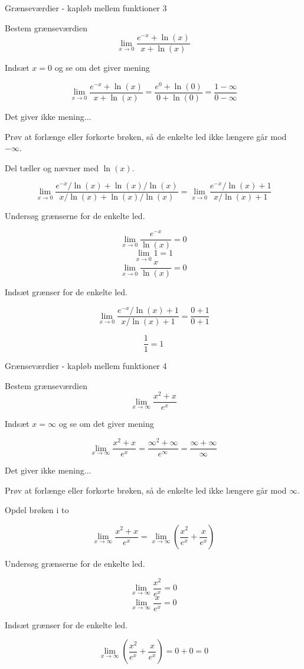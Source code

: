 \documentclass{article}
\begin{document}
\begin{exercise}{Grænseværdier - kapløb mellem funktioner 3}
	
	Bestem grænseværdien 
	\[
	\lim_{x \to 0} \frac{e^{-x}+ \ln(x)}{x+\ln(x)}
	\]
	
	
	\hint
	Indsæt $x=0$ og se om det giver mening
	
	\hint
	\[
	\lim_{x \to 0} \frac{e^{-x}+ \ln(x)}{x+\ln(x)} = \frac{e^{0}+ \ln(0)}{0+\ln(0)} = \frac{1 - \infty}{0 -\infty}
	\]
	
	\hint
	Det giver ikke mening...
	
	\hint
	Prøv at forlænge eller forkorte brøken, så de enkelte led ikke længere går mod $-\infty$. 
	
	\hint
	Del tæller og nævner med $\ln(x)$. 
	
	\hint
	\[
	\lim_{x \to 0} \frac{e^{-x}/\ln(x)+ \ln(x)/\ln(x)}{x/\ln(x)+\ln(x)/\ln(x)} = \lim_{x \to 0} \frac{e^{-x}/\ln(x)+ 1}{x/\ln(x)+1}
	\]
	
	\hint
	Undersøg grænserne for de enkelte led.
	
	\hint
	\[
	\lim_{x \to 0} \frac{e^{-x}}{\ln(x)} = 0
	\]
	\[
	\lim_{x \to 0} 1 = 1
	\]
	\[
	\lim_{x \to 0} \frac{x}{\ln(x)} = 0  
	\]
	
	\hint 
	Indsæt grænser for de enkelte led.
	
	\hint
	\[
	\lim_{x \to 0} \frac{e^{-x}/\ln(x)+ 1}{x/\ln(x)+1} =  \frac{0+ 1}{0+1}
	\]
	
	\hint
	\[
	\frac{1}{1} = 1
	\]
	
\end{exercise}
\newpage

\begin{exercise}{Grænseværdier - kapløb mellem funktioner 4}
	
	Bestem grænseværdien 
	\[
	\lim_{x \to \infty} \frac{x^2+x}{e^x}
	\]
	
	
	\hint
	Indsæt $x=\infty$ og se om det giver mening
	
	\hint
	\[
	\lim_{x \to \infty} \frac{x^2+x}{e^x} = \frac{\infty^2+\infty}{e^\infty} = \frac{\infty + \infty}{\infty} 
	\]
	
	\hint
	Det giver ikke mening...
	
	\hint
	Prøv at forlænge eller forkorte brøken, så de enkelte led ikke længere går mod $\infty$. 
	
	\hint
	Opdel brøken i to
	
	\hint
	\[
	\lim_{x \to \infty} \frac{x^2+x}{e^x} = \lim_{x \to \infty} \left( \frac{x^2}{e^x} + \frac{x}{e^x} \right)
	\]
	
	\hint
	Undersøg grænserne for de enkelte led.
	
	\hint
	\[
	\lim_{x \to \infty} \frac{x^2}{e^x} = 0
	\]
	\[
	\lim_{x \to \infty} \frac{x}{e^x} = 0
	\]
	
	\hint 
	Indsæt grænser for de enkelte led.
	
	\hint
	\[
	\lim_{x \to \infty} \left( \frac{x^2}{e^x} + \frac{x}{e^x} \right) = 0+0 = 0
	\]
	
	
\end{exercise}
\newpage
\end{document}
